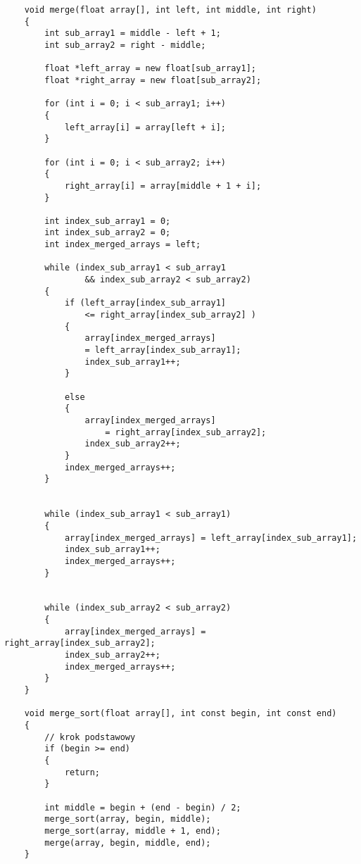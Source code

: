 \begin{lstlisting}
    void merge(float array[], int left, int middle, int right)    
    {
        int sub_array1 = middle - left + 1;      
        int sub_array2 = right - middle;

        float *left_array = new float[sub_array1];    
        float *right_array = new float[sub_array2];

        for (int i = 0; i < sub_array1; i++)          
        {
            left_array[i] = array[left + i];
        }

        for (int i = 0; i < sub_array2; i++)          
        {
            right_array[i] = array[middle + 1 + i];
        }

        int index_sub_array1 = 0;                    
        int index_sub_array2 = 0;
        int index_merged_arrays = left;               

        while (index_sub_array1 < sub_array1 
                && index_sub_array2 < sub_array2)         
        {
            if (left_array[index_sub_array1] 
                <= right_array[index_sub_array2] )         
            {
                array[index_merged_arrays] 
                = left_array[index_sub_array1];              
                index_sub_array1++;
            }

            else                                                                        
            {
                array[index_merged_arrays] 
                    = right_array[index_sub_array2];
                index_sub_array2++;
            }
            index_merged_arrays++;
        }


        while (index_sub_array1 < sub_array1)                                           
        {
            array[index_merged_arrays] = left_array[index_sub_array1];
            index_sub_array1++;
            index_merged_arrays++;
        }


        while (index_sub_array2 < sub_array2)                                           
        {
            array[index_merged_arrays] = right_array[index_sub_array2];
            index_sub_array2++;
            index_merged_arrays++;
        }
    }

    void merge_sort(float array[], int const begin, int const end)                      
    {   
        // krok podstawowy
        if (begin >= end)                                    
        {
            return;
        }

        int middle = begin + (end - begin) / 2;              
        merge_sort(array, begin, middle);                   
        merge_sort(array, middle + 1, end);
        merge(array, begin, middle, end);
    }
\end{lstlisting}






